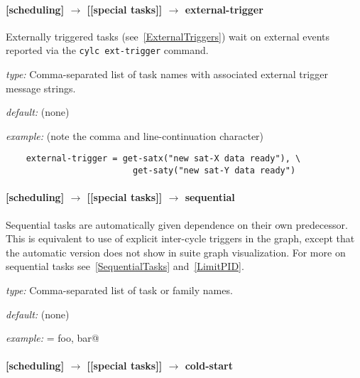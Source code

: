 \paragraph[external-trigger]{[scheduling] $\rightarrow$ [[special tasks]] $\rightarrow$ external-trigger}

Externally triggered tasks (see~\ref{ExternalTriggers}) wait on external events
reported via the \lstinline=cylc ext-trigger= command.

\begin{myitemize}
    \item {\em type:} Comma-separated list of task names with associated
        external trigger message strings.
    \item {\em default:} (none)
    \item {\em example:} (note the comma and line-continuation character)
\begin{lstlisting}
    external-trigger = get-satx("new sat-X data ready"), \
                         get-saty("new sat-Y data ready")
\end{lstlisting}
\end{myitemize}


\paragraph[sequential]{[scheduling] $\rightarrow$ [[special tasks]] $\rightarrow$ sequential}

Sequential tasks are automatically given dependence on their own
predecessor. This is equivalent to use of explicit inter-cycle triggers
in the graph, except that the automatic version does not show in suite
graph visualization. For more on sequential tasks see~\ref{SequentialTasks}
and~\ref{LimitPID}.

\begin{myitemize}
    \item {\em type:} Comma-separated list of task or family names.
    \item {\em default:} (none)
    \item {\em example:} \lstinline@sequential = foo, bar@
\end{myitemize}

\paragraph[cold-start]{[scheduling] $\rightarrow$ [[special tasks]] $\rightarrow$ cold-start}


